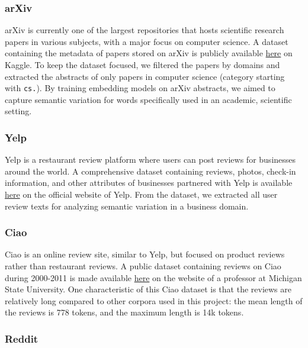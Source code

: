 \documentclass[11pt]{article}
\begin{document}
\subsubsection{arXiv}

arXiv is currently one of the largest repositories that hosts scientific research papers in various subjects, with a major focus on computer science. A dataset containing the metadata of papers stored on arXiv is publicly available \href{https://www.kaggle.com/datasets/Cornell-University/arxiv}{here} on Kaggle. To keep the dataset focused, we filtered the papers by domains and extracted the abstracts of only papers in computer science (category starting with \texttt{cs.}). By training embedding models on arXiv abstracts, we aimed to capture semantic variation for words specifically used in an academic, scientific setting.

\subsubsection{Yelp}

Yelp is a restaurant review platform where users can post reviews for businesses around the world. A comprehensive dataset containing reviews, photos, check-in information, and other attributes of businesses partnered with Yelp is available \href{https://business.yelp.com/data/resources/open-dataset/}{here} on the official website of Yelp. From the dataset, we extracted all user review texts for analyzing semantic variation in a business domain.

\subsubsection{Ciao}

Ciao is an online review site, similar to Yelp, but focused on product reviews rather than restaurant reviews. A public dataset containing reviews on Ciao during 2000-2011 is made available \href{https://www.cse.msu.edu/~tangjili/trust.html}{here} on the website of a professor at Michigan State University. One characteristic of this Ciao dataset is that the reviews are relatively long compared to other corpora used in this project: the mean length of the reviews is 778 tokens, and the maximum length is 14k tokens.

\subsubsection{Reddit}
\end{document}
